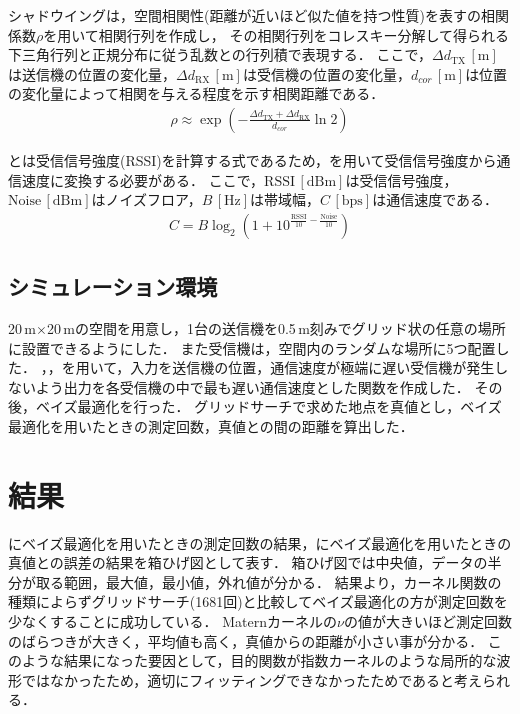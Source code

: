 \documentclass[twocolumn]{ltjarticle}
\begin{document}
シャドウイングは，空間相関性(距離が近いほど似た値を持つ性質)を表すの相関係数\(\rho\)を用いて相関行列を作成し，
その相関行列をコレスキー分解して得られる下三角行列と正規分布に従う乱数との行列積で表現する\cite{shadowing}．
ここで，\(\Delta d_{\mathrm{TX}}\,\mathrm{[m]}\)は送信機の位置の変化量，\(\Delta d_{\mathrm{RX}}\,\mathrm{[m]}\)は受信機の位置の変化量，\(d_{cor}\,\mathrm{[m]}\)は位置の変化量によって相関を与える程度を示す相関距離である．
\begin{align}
	\rho \approx \exp \left( - \frac{\Delta d_{\mathrm{TX}} + \Delta d_{\mathrm{RX}}}{d_{cor}} \ln 2 \right) \label{eq:shadowing}
\end{align}

とは受信信号強度(RSSI)を計算する式であるため，を用いて受信信号強度から通信速度に変換する必要がある．
ここで，\(\mathrm{RSSI}\,[\mathrm{dBm}]\)は受信信号強度，\(\mathrm{Noise}\,[\mathrm{dBm}]\)はノイズフロア，\(B\,[\mathrm{Hz}]\)は帯域幅，\(C\,[\mathrm{bps}]\)は通信速度である．
\begin{align}
	C = B \log_2 \left( 1 + 10^{\frac{\mathrm{RSSI}}{10}-\frac{\mathrm{Noise}}{10}} \right) \label{eq:capacity}
\end{align}
\subsection{シミュレーション環境}

20\(\,\)m\(\times\)20\(\,\)mの空間を用意し，1台の送信機を0.5\(\,\mathrm{m}\)刻みでグリッド状の任意の場所に設置できるようにした．
また受信機は，空間内のランダムな場所に5つ配置した．
，，を用いて，入力を送信機の位置，通信速度が極端に遅い受信機が発生しないよう出力を各受信機の中で最も遅い通信速度とした関数を作成した．
その後，ベイズ最適化を行った．
グリッドサーチで求めた地点を真値とし，ベイズ最適化を用いたときの測定回数，真値との間の距離を算出した．
\section{結果}

にベイズ最適化を用いたときの測定回数の結果，にベイズ最適化を用いたときの真値との誤差の結果を箱ひげ図として表す．
箱ひげ図では中央値，データの半分が取る範囲，最大値，最小値，外れ値が分かる．
結果より，カーネル関数の種類によらずグリッドサーチ(1681回)と比較してベイズ最適化の方が測定回数を少なくすることに成功している．
Maternカーネルの\(\nu\)の値が大きいほど測定回数のばらつきが大きく，平均値も高く，真値からの距離が小さい事が分かる．
このような結果になった要因として，目的関数が指数カーネルのような局所的な波形ではなかったため，適切にフィッティングできなかったためであると考えられる．
\end{document}

